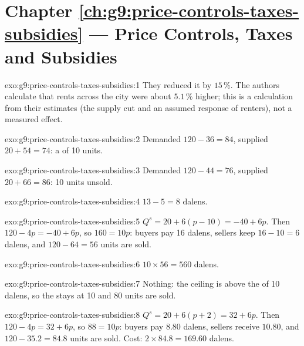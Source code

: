 \section*{Chapter \ref{ch:g9:price-controls-taxes-subsidies} --- Price Controls, Taxes and Subsidies}

\begin{solution}{exo:g9:price-controls-taxes-subsidies:1}
They reduced it by $15\,\%$. The authors calculate that rents across the city were about $5.1\,\%$
higher; this is a calculation from their estimates (the supply cut and an assumed response of renters),
not a measured effect.
\end{solution}

\begin{solution}{exo:g9:price-controls-taxes-subsidies:2}
Demanded $120 - 36 = 84$, supplied $20 + 54 = 74$: a  of 10 units.
\end{solution}

\begin{solution}{exo:g9:price-controls-taxes-subsidies:3}
Demanded $120 - 44 = 76$, supplied $20 + 66 = 86$: 10 units unsold.
\end{solution}

\begin{solution}{exo:g9:price-controls-taxes-subsidies:4}
$13 - 5 = 8$ dalens.
\end{solution}

\begin{solution}{exo:g9:price-controls-taxes-subsidies:5}
$Q^s = 20 + 6(p - 10) = -40 + 6p$. Then $120 - 4p = -40 + 6p$, so $160 = 10p$: buyers pay 16 dalens,
sellers keep $16 - 10 = 6$ dalens, and $120 - 64 = 56$ units are sold.
\end{solution}

\begin{solution}{exo:g9:price-controls-taxes-subsidies:6}
$10 \times 56 = 560$ dalens.
\end{solution}

\begin{solution}{exo:g9:price-controls-taxes-subsidies:7}
Nothing: the ceiling is above the  of 10 dalens, so the  stays at 10 and 80 units are
sold.
\end{solution}

\begin{solution}{exo:g9:price-controls-taxes-subsidies:8}
$Q^s = 20 + 6(p + 2) = 32 + 6p$. Then $120 - 4p = 32 + 6p$, so $88 = 10p$: buyers pay $8.80$ dalens,
sellers receive $10.80$, and $120 - 35.2 = 84.8$ units are sold. Cost: $2 \times 84.8 = 169.60$ dalens.
\end{solution}

